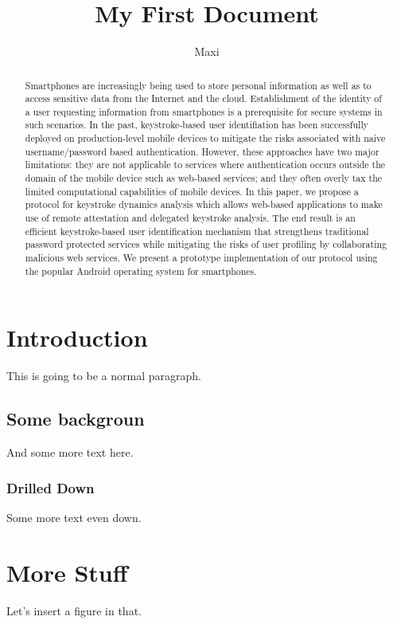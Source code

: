 \documentclass{article}
\title{My First Document}
\author{Maxi}
\begin{document}
	\maketitle
	
	\begin{abstract}
		Smartphones are increasingly being used to store personal information as well as to access sensitive data from the Internet and the cloud. Establishment of the identity of a user requesting information from smartphones is a prerequisite for  secure systems in such scenarios. In the past, keystroke-based user identifiation has been successfully deployed on production-level mobile devices to mitigate the risks associated with naive username/password based authentication. However, these approaches have two major limitations: they are not applicable to services where authentication occurs outside the domain of the mobile
		device such as web-based services; and they often overly tax the limited computational capabilities of mobile devices. In this paper, we propose a protocol for keystroke dynamics analysis which allows web-based applications to make use of remote attestation and delegated keystroke analysis. The end result is an efficient keystroke-based user identification mechanism that strengthens traditional password protected services
		while mitigating the risks of user profiling by collaborating malicious web
		services. We present a prototype implementation of our protocol using
		the popular Android operating system for smartphones.
	\end{abstract}
	
	\section{Introduction}
	This is going to be a normal paragraph.
	
		\subsection{Some backgroun}
			And some more text here.
			
				\subsubsection{Drilled Down}\label{sec:drilled-down}
					Some more text even down.
	
	\newpage
	\section{More Stuff}
	Let's insert a figure in that.
	
\end{document}
